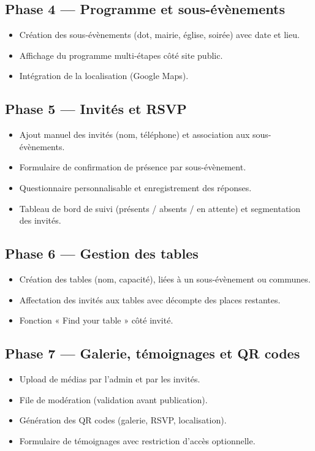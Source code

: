 \documentclass[11pt,a4paper]{article}
\begin{document}
\subsection{Phase 4 --- Programme et sous-évènements}
\begin{itemize}[leftmargin=1.2cm]
  \item Création des sous-évènements (dot, mairie, église, soirée) avec date et
        lieu.
  \item Affichage du programme multi-étapes côté site public.
  \item Intégration de la localisation (Google Maps).
\end{itemize}

\subsection{Phase 5 --- Invités et RSVP}
\begin{itemize}[leftmargin=1.2cm]
  \item Ajout manuel des invités (nom, téléphone) et association aux
        sous-évènements.
  \item Formulaire de confirmation de présence par sous-évènement.
  \item Questionnaire personnalisable et enregistrement des réponses.
  \item Tableau de bord de suivi (présents / absents / en attente) et segmentation
        des invités.
\end{itemize}

\subsection{Phase 6 --- Gestion des tables}
\begin{itemize}[leftmargin=1.2cm]
  \item Création des tables (nom, capacité), liées à un sous-évènement ou communes.
  \item Affectation des invités aux tables avec décompte des places restantes.
  \item Fonction « Find your table » côté invité.
\end{itemize}

\subsection{Phase 7 --- Galerie, témoignages et QR codes}
\begin{itemize}[leftmargin=1.2cm]
  \item Upload de médias par l'admin et par les invités.
  \item File de modération (validation avant publication).
  \item Génération des QR codes (galerie, RSVP, localisation).
  \item Formulaire de témoignages avec restriction d'accès optionnelle.
\end{itemize}
\end{document}
